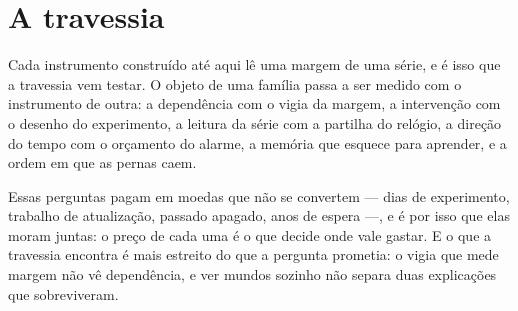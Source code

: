 \documentclass[12pt]{book}
\theoremstyle{definition}
\theoremstyle{remark}
\begin{document}




















\part{A travessia}

Cada instrumento construído até aqui lê uma margem de uma série, e é isso que a travessia
vem testar. O objeto de uma família passa a ser medido com o instrumento de outra: a dependência
com o vigia da margem, a intervenção com o desenho do experimento, a leitura da série com a
partilha do relógio, a direção do tempo com o orçamento do alarme, a memória que esquece para
aprender, e a ordem em que as pernas caem.

Essas perguntas pagam em moedas que não se convertem --- dias de experimento, trabalho de
atualização, passado apagado, anos de espera ---, e é por isso que elas moram juntas: o preço de
cada uma é o que decide onde vale gastar. E o que a travessia encontra é mais estreito do que a
pergunta prometia: o vigia que mede margem não vê dependência, e ver mundos sozinho não separa
duas explicações que sobreviveram.


\end{document}
